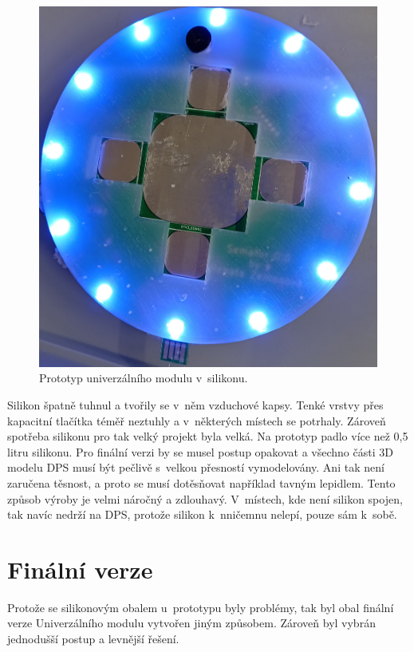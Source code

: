 \begin{figure}[!h]
  \begin{center}
    \includegraphics[scale=0.15]{obrazky/DPS_prototyp_v_silikonu.jpg}
  \end{center}
  \caption[Prototyp univerzálního modulu v~silikonu]{Prototyp univerzálního modulu v~silikonu.}
\end{figure}

Silikon špatně tuhnul a tvořily se v~něm vzduchové kapsy. Tenké vrstvy přes kapacitní tlačítka téměř neztuhly a v~některých místech se potrhaly. Zároveň spotřeba silikonu pro tak velký projekt byla velká. 
Na prototyp padlo více než 0,5 litru silikonu. Pro finální verzi by se musel postup opakovat a všechno části 3D modelu DPS musí být pečlivě s~velkou přesností vymodelovány. Ani tak není zaručena těsnost,
a proto se musí dotěsňovat například tavným lepidlem. Tento způsob výroby je velmi náročný a zdlouhavý. V~místech, kde není silikon spojen, tak navíc nedrží na DPS, protože silikon k~nničemnu nelepí, pouze 
sám k~sobě. 

\section{Finální verze}
Protože se silikonovým obalem u~prototypu byly problémy, tak byl obal finální verze Univerzálního modulu vytvořen jiným způsobem. Zároveň byl vybrán jednodušší postup a levnější řešení. 

